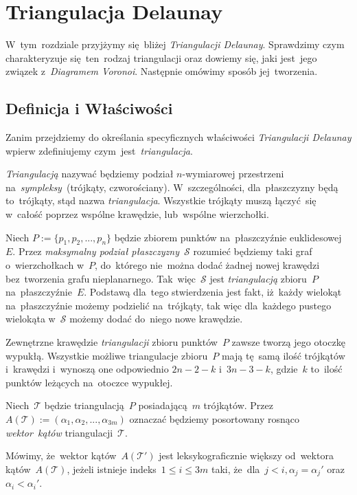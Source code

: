 \documentclass[skorowidz,autorrok,backref,xodstep,oswiadczenie]{wmimgr}
\begin{document}
\chapter{Triangulacja Delaunay}

W~tym~rozdziale przyjżymy się~bliżej \emph{Triangulacji Delaunay}. Sprawdzimy czym charakteryzuje się~ten~rodzaj triangulacji oraz dowiemy się, jaki jest~jego związek z~\emph{Diagramem Voronoi}. Następnie omówimy sposób jej~tworzenia.

\section{Definicja i Właściwości}

Zanim przejdziemy do określania specyficznych właściwości \emph{Triangulacji Delaunay} wpierw zdefiniujemy czym~jest~\emph{triangulacja}.

\emph{Triangulacją} nazywać będziemy podział $n$-wymiarowej przestrzeni na~\emph{sympleksy}~(trójkąty, czworościany). W~szczególności, dla~płaszczyzny będą to~trójkąty, stąd nazwa \emph{triangulacja}. Wszystkie trójkąty muszą łączyć~się w~całość poprzez wspólne krawędzie, lub~wspólne wierzchołki.

Niech $P:=\{ p_{1},p_{2},...,p_{n} \}$ będzie zbiorem punktów na~płaszczyźnie euklidesowej $E$. Przez \emph{maksymalny podział płaszczyzny}~$\mathcal{S}$ rozumieć będziemy taki graf o~wierzchołkach w~$P$, do~którego nie~można dodać żadnej nowej krawędzi bez~tworzenia grafu nieplanarnego. Tak~więc~$\mathcal{S}$ jest \emph{triangulacją} zbioru~$P$ na~płaszczyźnie~$E$. Podstawą dla~tego stwierdzenia jest fakt, iż~każdy wielokąt na~płaszczyźnie możemy podzielić na~trójkąty\cite{geometria}, tak więc dla~każdego pustego wielokąta w~$\mathcal{S}$ możemy dodać do~niego nowe krawędzie.

Zewnętrzne krawędzie \emph{triangulacji} zbioru punktów~$P$ zawsze tworzą jego otoczkę wypukłą. Wszystkie możliwe triangulacje zbioru~$P$ mają tę~samą ilość trójkątów i~krawędzi i~wynoszą one odpowiednio $2n-2-k$ i~$3n-3-k$, gdzie~$k$ to~ilość punktów leżących na~otoczce wypukłej.

Niech~$\mathcal{T}$ będzie triangulacją~$P$ posiadającą~$m$ trójkątów. Przez~$A(\mathcal{T}) := (\alpha_{1}, \alpha_{2}, ..., \alpha_{3m})$ oznaczać będziemy posortowany rosnąco \emph{wektor~kątów} triangulacji~$\mathcal{T}$.

Mówimy, że~wektor kątów~$A(\mathcal{T'})$ jest leksykograficznie większy od~wektora kątów~$A(\mathcal{T})$, jeżeli istnieje indeks~$1 \leq i \leq 3m$ taki, że~dla~$j < i, \alpha_{j} = \alpha_{j}'$ oraz~$\alpha_{i} < \alpha_{i}'$.
\end{document}
